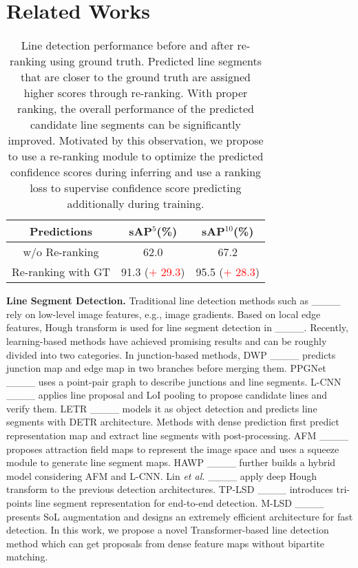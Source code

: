 \section{Related Works}
\begin{table}[tb]
    \centering
    \begin{tabular}{c c c}
        \toprule
         Predictions & sAP$^{5}$(\%) & sAP$^{10}$(\%)\\
        \midrule
         w/o Re-ranking & 62.0 & 67.2 \\
         Re-ranking with GT & 91.3 (\textcolor{red}{$+$ 29.3}) & 95.5 (\textcolor{red}{$+$ 28.3})\\
        \bottomrule
    \end{tabular}
    \caption{Line detection performance before and after re-ranking using ground truth. Predicted line segments that are closer to the ground truth are assigned higher scores through re-ranking. With proper ranking, the overall performance of the predicted candidate line segments can be significantly improved. Motivated by this observation, we propose to use a re-ranking module to optimize the predicted confidence scores during inferring and use a ranking loss to supervise confidence score predicting additionally during training.}
    \label{tab:w/o ranking}
\end{table}

\textbf{Line Segment Detection.} Traditional line detection methods such as ____ rely on low-level image features, e.g., image gradients. Based on local edge features, Hough transform is used for line segment detection in ____.
Recently, learning-based methods have achieved promising results and can be roughly divided into two categories. In junction-based methods, DWP ____ predicts junction map and edge map in two branches before merging them. PPGNet ____ uses a point-pair graph to describe junctions and line segments. L-CNN ____ applies line proposal and LoI pooling to propose candidate lines and verify them. LETR ____ models it as object detection and predicts line segments with DETR architecture. 
Methods with dense prediction first predict representation map and extract line segments with post-processing. AFM ____ proposes attraction field maps to represent the image space and uses a squeeze module to generate line segment maps. HAWP ____ further builds a hybrid model considering AFM and L-CNN. Lin \textit{et al.} ____ apply deep Hough transform to the previous detection architectures. TP-LSD ____ introduces tri-points line segment representation for end-to-end detection. M-LSD ____ presents SoL augmentation and designs an extremely efficient architecture for fast detection.
In this work, we propose a novel Transformer-based line detection method which can get proposals from dense feature maps without bipartite matching.

